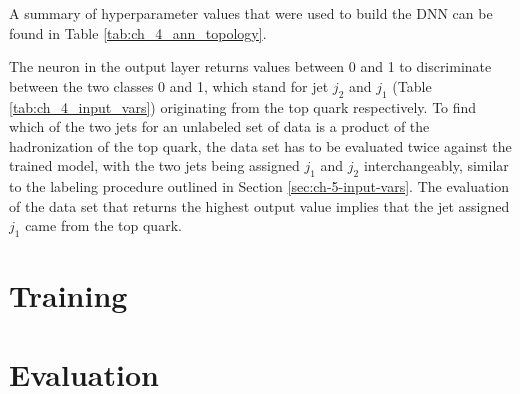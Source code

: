 A summary of hyperparameter values that were used to build the DNN can be found in Table \ref{tab:ch_4_ann_topology}.

The neuron in the output layer returns values between 0 and 1 to discriminate between the two classes 0 and 1, which stand for jet $j_2$ and $j_1$ (Table \ref{tab:ch_4_input_vars}) originating from the top quark respectively. To find which of the two jets for an unlabeled set of data is a product of the hadronization of the top quark, the data set has to be evaluated twice against the trained model, with the two jets being assigned $j_1$ and $j_2$ interchangeably, similar to the labeling procedure outlined in Section \ref{sec:ch-5-input-vars}. The evaluation of the data set that returns the highest output value implies that the jet assigned $j_1$ came from the top quark.

\section{Training}
\label{sec:ch-5-training}

\section{Evaluation}
\label{sec:ch-5-eval}